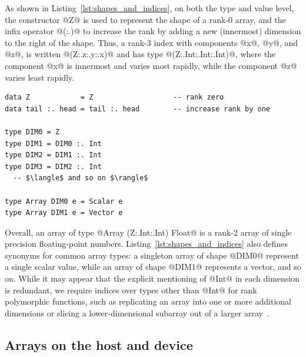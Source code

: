 As shown in Listing~\ref{lst:shapes_and_indices}, on both the type and value
level, the constructor @Z@ is used to represent the shape of a rank-0 array, and
the infix operator @(:.)@ to increase the rank by adding a new (innermost)
dimension to the right of the shape. Thus, a rank-3 index with components @x@,
@y@, and @z@, is written @(Z:.z:.y:.x)@ and has type @(Z:.Int:.Int:.Int)@, where
the component @x@ is innermost and varies most rapidly, while the component @z@
varies least rapidly.

\begin{lstlisting}[style=haskell
    ,float
    ,label=lst:shapes_and_indices
    ,caption={Types of array shapes and indices}]
data Z            = Z                   -- rank zero
data tail :. head = tail :. head        -- increase rank by one

type DIM0 = Z
type DIM1 = DIM0 :. Int
type DIM2 = DIM1 :. Int
type DIM3 = DIM2 :. Int
  -- $\langle$ and so on $\rangle$

type Array DIM0 e = Scalar e
type Array DIM1 e = Vector e
\end{lstlisting}

Overall, an array of type @Array (Z:.Int:.Int) Float@ is a rank-2 array of
single precision floating-point numbers. Listing~\ref{lst:shapes_and_indices}
also defines synonyms for common array types: a singleton array of shape @DIM0@
represent a single scalar value, while an array of shape @DIM1@ represents a
vector, and so on. While it may appear that the explicit mentioning of @Int@ in
each dimension is redundant, we require indices over types other than @Int@ for
rank polymorphic functions, such as replicating an array into one or more
additional dimensions or slicing a lower-dimensional subarray out of a larger
array~\cite{Keller:2010er}.


\subsection{Arrays on the host and device}
\label{sec:arrays_on_the_host_and_device}

